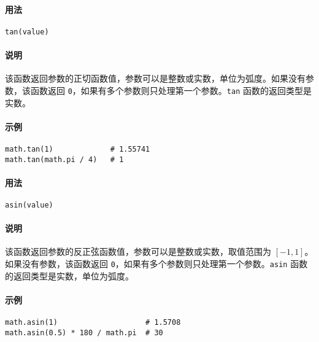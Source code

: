 
\paragraph{用法}
\begin{lstlisting}[language=berry, numbers=none]
tan(value)
\end{lstlisting}

\paragraph{说明}
该函数返回参数的正切函数值，参数可以是整数或实数，单位为弧度。如果没有参数，该函数返回 \texttt{0}，如果有多个参数则只处理第一个参数。\texttt{tan} 函数的返回类型是实数。

\paragraph{示例}
\begin{lstlisting}[language=berry, numbers=none]
math.tan(1)             # 1.55741
math.tan(math.pi / 4)   # 1
\end{lstlisting}


\paragraph{用法}
\begin{lstlisting}[language=berry, numbers=none]
asin(value)
\end{lstlisting}

\paragraph{说明}
该函数返回参数的反正弦函数值，参数可以是整数或实数，取值范围为 $[-1,1]$。如果没有参数，该函数返回 \texttt{0}，如果有多个参数则只处理第一个参数。\texttt{asin} 函数的返回类型是实数，单位为弧度。

\paragraph{示例}
\begin{lstlisting}[language=berry, numbers=none]
math.asin(1)                    # 1.5708
math.asin(0.5) * 180 / math.pi  # 30
\end{lstlisting}

